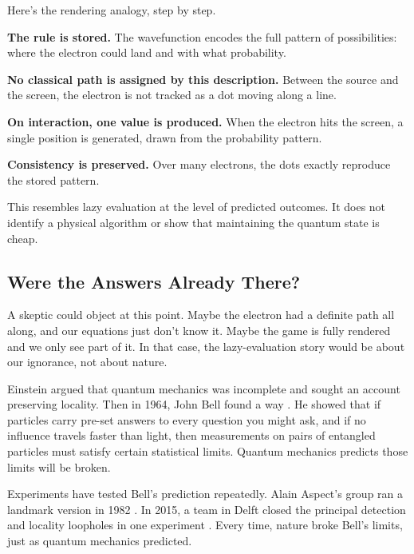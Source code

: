 \begin{examplebox}
Here's the rendering analogy, step by step.

\begin{compactchecklist}
\item \textbf{The rule is stored.} The wavefunction encodes the full pattern of possibilities: where the electron could land and with what probability.
\item \textbf{No classical path is assigned by this description.} Between the source and the screen, the electron is not tracked as a dot moving along a line.
\item \textbf{On interaction, one value is produced.} When the electron hits the screen, a single position is generated, drawn from the probability pattern.
\item \textbf{Consistency is preserved.} Over many electrons, the dots exactly reproduce the stored pattern.
\end{compactchecklist}

This resembles lazy evaluation at the level of predicted outcomes. It does not identify a physical algorithm or show that maintaining the quantum state is cheap.
\end{examplebox}

\subsection{Were the Answers Already There?}

A skeptic could object at this point. Maybe the electron had a definite path all along, and our equations just don't know it. Maybe the game is fully rendered and we only see part of it. In that case, the lazy-evaluation story would be about our ignorance, not about nature.

Einstein argued that quantum mechanics was incomplete and sought an account preserving locality. Then in 1964, John Bell found a way \cite{bell1964}. He showed that if particles carry pre-set answers to every question you might ask, and if no influence travels faster than light, then measurements on pairs of entangled particles must satisfy certain statistical limits. Quantum mechanics predicts those limits will be broken.

Experiments have tested Bell's prediction repeatedly. Alain Aspect's group ran a landmark version in 1982 \cite{aspect1982}. In 2015, a team in Delft closed the principal detection and locality loopholes in one experiment \cite{hensen2015}. Every time, nature broke Bell's limits, just as quantum mechanics predicted.

